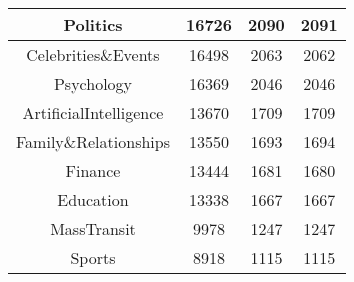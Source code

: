 \begin{table}[]
{\begin{tabular}{|c||c|c|c|}
Politics & 16726 & 2090 & 2091 \\ \hline 
Celebrities\&Events & 16498 & 2063 & 2062 \\ \hline 
Psychology & 16369 & 2046 & 2046 \\ \hline 
ArtificialIntelligence & 13670 & 1709 & 1709 \\ \hline 
Family\&Relationships & 13550 & 1693 & 1694 \\ \hline 
Finance & 13444 & 1681 & 1680 \\ \hline 
Education & 13338 & 1667 & 1667 \\ \hline 
MassTransit & 9978 & 1247 & 1247 \\ \hline 
Sports & 8918 & 1115 & 1115 \\ \hline 
\end{tabular}}
\end{table}

